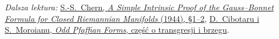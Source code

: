 \par\smallskip
{\footnotesize\noindent\emph{Dalsza lektura:}
\href{https://webhomes.maths.ed.ac.uk/~v1ranick/papers/chern7.pdf}
{S.-S.\ Chern, \emph{A Simple Intrinsic Proof of the
Gauss--Bonnet Formula for Closed Riemannian Manifolds}
(1944), §1--2},
\href{https://www.imar.ro/~sergium/fisiere/pfa.pdf}
{D.\ Cibotaru i S.\ Moroianu,
\emph{Odd Pfaffian Forms},
część o transgresji i brzegu}.\par}

